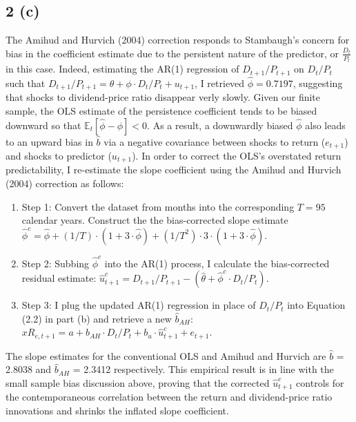 \documentclass[11pt]{article}
\begin{document}
\subsection*{2 (c)} 
The Amihud and Hurvich (2004) correction responds to Stambaugh's concern for bias in the coefficient estimate due to the persistent nature of the predictor, or $\frac{D_t}{P_t}$ in this case. Indeed, estimating the AR(1) regression of $D_{t+1}/P_{t+1}$ on $D_t/P_t$  such that $D_{t+1}/ P_{t+1} = \theta + \phi \cdot D_t/P_t + u_{t+1} $, I retrieved $\hat{\phi} = 0.7197$, suggesting that shocks to dividend-price ratio disappear verly slowly. Given our finite sample, the OLS estimate of the persistence coefficient tends to be biased downward so that $\mathbb{E}_t[\hat{\phi} - \phi ] < 0$. As a result, a downwardly biased $\hat{\phi}$ also leads to an upward bias in $\hat{b}$ via a negative covariance between shocks to return ($e_{t+1}$) and shocks to predictor ($u_{t+1}$). In order to correct the OLS's overstated return predictability, I re-estimate the slope coefficient using the Amihud and Hurvich (2004) correction as follows: 
\begin{enumerate}
    \item Step 1: Convert the dataset from months into the corresponding $T=95$ calendar years. Construct the the bias-corrected slope estimate $\hat{\phi}^{c} = \hat{\phi} + (1/T) \cdot (1+ 3 \cdot \hat{\phi}) + (1/T^2) \cdot 3 \cdot (1+ 3 \cdot \hat{\phi})$.
    \item Step 2: Subbing $\hat{\phi}^{c}$ into the AR(1) process, I calculate the bias-corrected residual estimate: $\hat{u}_{t+1}^{c} = D_{t+1}/ P_{t+1} - (\hat{\theta} +  \hat{\phi}^{c} \cdot D_t/P_t)$. 
    \item Step 3: I plug the updated AR(1) regression in place of $D_t/P_t$ into Equation (2.2) in part (b) and retrieve a new $\hat{b}_{AH}$: $xR_{e,t+1} = a + b_{AH} \cdot D_t/P_t + b_{u} \cdot \hat{u}_{t+1}^{c} + e_{t+1}$. 
\end{enumerate}

The slope estimates for the conventional OLS and Amihud and Hurvich are $\hat{b}$ = 2.8038 and $\hat{b}_{AH}$ = 2.3412 respectively. This empirical result is in line with the small sample bias discussion above, proving that the corrected $\hat{u}_{t+1}^{c}$ controls for the contemporaneous correlation between the return and dividend-price ratio innovations and shrinks the inflated slope coefficient.
\end{document}
